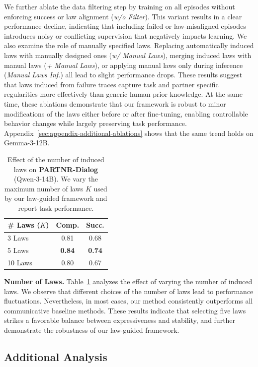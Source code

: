 \documentclass{article}
\theoremstyle{plain}
\theoremstyle{definition}
\theoremstyle{remark}
\begin{document}
We further ablate the data filtering step by training on all episodes without enforcing success or law alignment (\textit{w/o Filter}). This variant results in a clear performance decline, indicating that including failed or law-misaligned episodes introduces noisy or conflicting supervision that negatively impacts learning. We also examine the role of manually specified laws. Replacing automatically induced laws with manually designed ones (\textit{w/ Manual Laws}), merging induced laws with manual laws (\textit{+ Manual Laws}), or applying manual laws only during inference (\textit{Manual Laws Inf.}) all lead to slight performance drops. These results suggest that laws induced from failure traces capture task and partner specific regularities more effectively than generic human prior knowledge. At the same time, these ablations demonstrate that our framework is robust to minor modifications of the laws either before or after fine-tuning, enabling controllable behavior changes while largely preserving task performance. Appendix~\ref{sec:appendix-additional-ablations} shows that the same trend holds on Gemma-3-12B.


\begin{table}[t]
\centering
\small
\setlength{\tabcolsep}{5pt}
\caption{Effect of the number of induced laws on \textbf{PARTNR-Dialog} (Qwen-3-14B). We vary the maximum number of laws $K$ used by our law-guided framework and report task performance.}
\label{tab:partnr-num-laws}
\begin{tabular}{l|cc}
\toprule
\textbf{\# Laws ($K$)} & \textbf{Comp.} & \textbf{Succ.} \\
\midrule
3 Laws  & 0.81 & 0.68 \\
5 Laws  & \textbf{0.84} & \textbf{0.74} \\
10 Laws & 0.80 & 0.67 \\
\bottomrule
\end{tabular}
\end{table}
\textbf{Number of Laws.}
Table~\ref{tab:partnr-num-laws} analyzes the effect of varying the number of induced laws. We observe that different choices of the number of laws lead to performance fluctuations. Nevertheless, in most cases, our method consistently outperforms all communicative baseline methods. These results indicate that selecting five laws strikes a favorable balance between expressiveness and stability, and further demonstrate the robustness of our law-guided framework.

\subsection{Additional Analysis}
\end{document}
